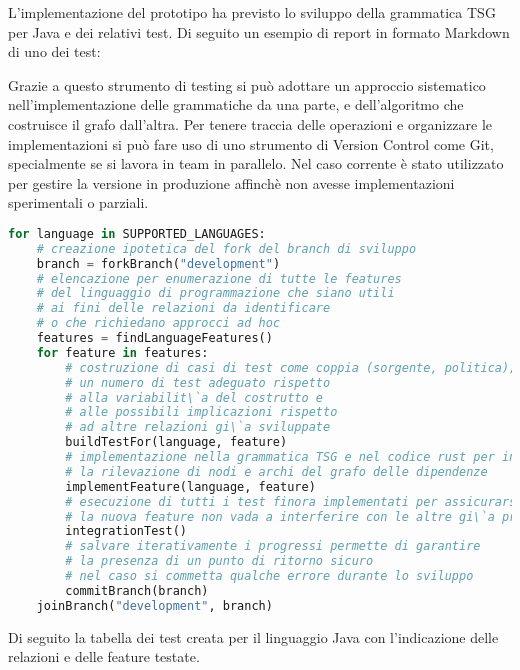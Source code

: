 L'implementazione del prototipo ha previsto lo sviluppo della grammatica TSG per Java e dei relativi test. Di seguito un esempio di report in formato Markdown di uno dei test:


Grazie a questo strumento di testing si pu\`o adottare un approccio sistematico nell'implementazione delle grammatiche da una parte, e dell'algoritmo che costruisce il grafo dall'altra. Per tenere traccia delle operazioni e organizzare le implementazioni si pu\`o fare uso di uno strumento di Version Control come Git, specialmente se si lavora in team in parallelo. Nel caso corrente \`e stato utilizzato per gestire la versione in produzione affinch\`e non avesse implementazioni sperimentali o parziali.

\begin{lstlisting}[caption="Processo di implementazione", language=Python]
for language in SUPPORTED_LANGUAGES:
    # creazione ipotetica del fork del branch di sviluppo
    branch = forkBranch("development")
    # elencazione per enumerazione di tutte le features
    # del linguaggio di programmazione che siano utili
    # ai fini delle relazioni da identificare
    # o che richiedano approcci ad hoc
    features = findLanguageFeatures()
    for feature in features:
        # costruzione di casi di test come coppia (sorgente, politica);
        # un numero di test adeguato rispetto
        # alla variabilit\`a del costrutto e
        # alle possibili implicazioni rispetto
        # ad altre relazioni gi\`a sviluppate
        buildTestFor(language, feature)
        # implementazione nella grammatica TSG e nel codice rust per introdurre
        # la rilevazione di nodi e archi del grafo delle dipendenze
        implementFeature(language, feature)
        # esecuzione di tutti i test finora implementati per assicurarsi che
        # la nuova feature non vada a interferire con le altre gi\`a presenti
        integrationTest()
        # salvare iterativamente i progressi permette di garantire
        # la presenza di un punto di ritorno sicuro
        # nel caso si commetta qualche errore durante lo sviluppo
        commitBranch(branch)
    joinBranch("development", branch)
\end{lstlisting}

Di seguito la tabella dei test creata per il linguaggio Java con l'indicazione delle relazioni e delle feature testate.

